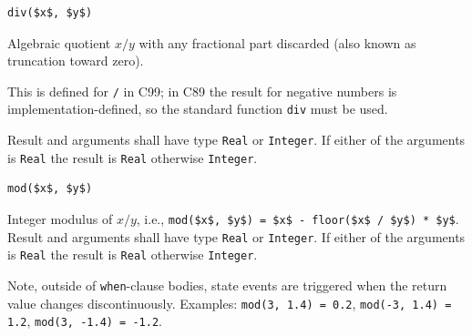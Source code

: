 \begin{operatordefinition}[div]
\begin{synopsis}\begin{lstlisting}
div($x$, $y$)
\end{lstlisting}\end{synopsis}
\begin{semantics}
Algebraic quotient $x / y$ with any fractional part discarded (also known as truncation toward zero).
\begin{nonnormative}
This is defined for \lstinline!/! in C99; in C89 the result for negative numbers is implementation-defined, so the standard function \lstinline[language=C]!div! must be used.
\end{nonnormative}
Result and arguments shall have type \lstinline!Real! or \lstinline!Integer!.
If either of the arguments is \lstinline!Real! the result is \lstinline!Real! otherwise \lstinline!Integer!.
\end{semantics}
\end{operatordefinition}

\begin{operatordefinition}[mod]
\begin{synopsis}\begin{lstlisting}
mod($x$, $y$)
\end{lstlisting}\end{synopsis}
\begin{semantics}
Integer modulus of $x / y$, i.e., \lstinline!mod($x$, $y$) = $x$ - floor($x$ / $y$) * $y$!.
Result and arguments shall have type \lstinline!Real! or \lstinline!Integer!.
If either of the arguments is \lstinline!Real! the result is \lstinline!Real! otherwise \lstinline!Integer!.
\begin{nonnormative}
Note, outside of \lstinline!when!-clause bodies, state events are triggered when the return value changes discontinuously.
Examples: \lstinline!mod(3, 1.4) = 0.2!, \lstinline!mod(-3, 1.4) = 1.2!, \lstinline!mod(3, -1.4) = -1.2!.
\end{nonnormative}
\end{semantics}
\end{operatordefinition}

